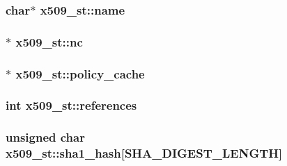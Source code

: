 \subsubsection[{\texorpdfstring{name}{name}}]{\setlength{\rightskip}{0pt plus 5cm}char$\ast$ x509\+\_\+st\+::name}\hypertarget{structx509__st_a447f3d7de20099a3a45fcc361a2d8f02}{}\label{structx509__st_a447f3d7de20099a3a45fcc361a2d8f02}
\subsubsection[{\texorpdfstring{nc}{nc}}]{$\ast$ x509\+\_\+st\+::nc}\hypertarget{structx509__st_a1f79b4f8402d962b6cee671e70c9b661}{}\label{structx509__st_a1f79b4f8402d962b6cee671e70c9b661}
\subsubsection[{\texorpdfstring{policy\+\_\+cache}{policy_cache}}]{$\ast$ x509\+\_\+st\+::policy\+\_\+cache}\hypertarget{structx509__st_af85ce8a268304c4850f30343b17c018c}{}\label{structx509__st_af85ce8a268304c4850f30343b17c018c}
\subsubsection[{\texorpdfstring{references}{references}}]{\setlength{\rightskip}{0pt plus 5cm}int x509\+\_\+st\+::references}\hypertarget{structx509__st_ab1114b325664bca1cdfd6854f247a4d5}{}\label{structx509__st_ab1114b325664bca1cdfd6854f247a4d5}
\subsubsection[{\texorpdfstring{sha1\+\_\+hash}{sha1_hash}}]{\setlength{\rightskip}{0pt plus 5cm}unsigned char x509\+\_\+st\+::sha1\+\_\+hash\mbox{[}{\bf S\+H\+A\+\_\+\+D\+I\+G\+E\+S\+T\+\_\+\+L\+E\+N\+G\+TH}\mbox{]}}\hypertarget{structx509__st_a5f14592600ea066dea895667d98f8614}{}\label{structx509__st_a5f14592600ea066dea895667d98f8614}
